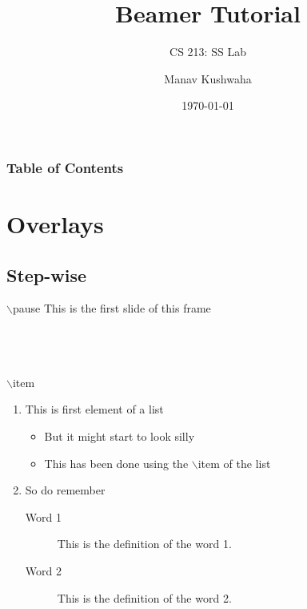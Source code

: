 \documentclass{beamer}
\title{Beamer Tutorial}
\subtitle{CS 213: SS Lab}
\author{Manav Kushwaha}
\institute[cse, IITDH]{Dep. of Comp. Sci. and Eng, IIT Dharwad}
\date{\today}
\begin{document}
    
    \frame[plain]{\titlepage}
    
    \begin{frame}
    \frametitle{Table of Contents}
    \tableofcontents
    \end{frame}
    
    \section{Overlays}
    \subsection{Step-wise}
    \begin{frame}{$\backslash$pause}
        This is the first slide of this frame \\
         \\
         \\
         \\
        \end{frame}
        
        \begin{frame}{$\backslash$item}
            \begin{enumerate}[<+->]
                \item This is first element of a list
                \begin{itemize}
                    \item But it might start to look silly
                    \item This has been done using the $\backslash$item of the list
                \end{itemize}
                \item So do remember
                \begin{description}
                    \item[Word 1] This is the definition of the word 1.
                    \item[Word 2] This is the definition of the word 2.
                \end{description}
            \end{enumerate}
        \end{frame}
    
\end{document}

